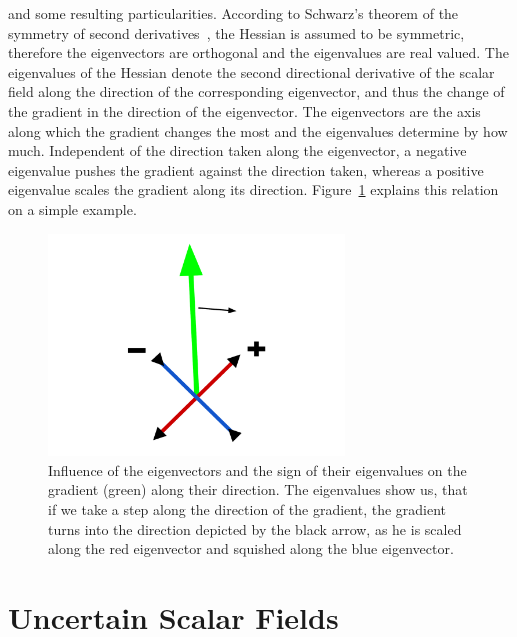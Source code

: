 \noindent and some resulting particularities. According to Schwarz's
theorem of the symmetry of second derivatives~\cite{Schwarz}, the
Hessian is assumed to be symmetric, therefore the eigenvectors are
orthogonal and the eigenvalues are real valued. The eigenvalues of the
Hessian denote the second directional derivative of the scalar field
along the direction of the corresponding eigenvector, and thus the
change of the gradient in the direction of the eigenvector. The
eigenvectors are the axis along which the gradient changes the most and
the eigenvalues determine by how much. Independent of the direction
taken along the eigenvector, a negative eigenvalue pushes the gradient
against the direction taken, whereas a positive eigenvalue scales the
gradient along its direction. Figure~\ref{fig:gradEV} explains this
relation on a simple example.
\begin{figure}
  \centering
  \includegraphics[width=0.7\textwidth]{Images/gradEV.pdf}
  \caption{Influence of the eigenvectors and the sign of their
  eigenvalues on the gradient (green) along their direction. The
  eigenvalues show us, that if we take a step along the direction of the
  gradient, the gradient turns into the direction depicted by the black
  arrow, as he is scaled along the red eigenvector and squished along
  the blue eigenvector.}
  \label{fig:gradEV}
\end{figure}

\section{Uncertain Scalar Fields}\label{sec:USF}

